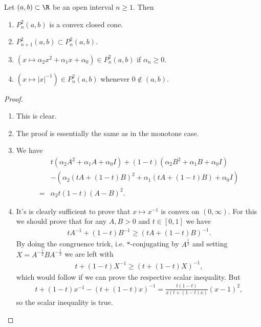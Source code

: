 \begin{prop}
	Let $(a, b) \subset \R$ be an open interval $n \geq 1$. Then
	\begin{enumerate}
		\item $P_{n}^{2}(a, b)$ is a convex closed cone.
		\item $P_{n + 1}^{2}(a, b) \subset P_{n}^{2}(a, b)$.
		\item $\left(x \mapsto \alpha_{2} x^{2} + \alpha_{1} x + \alpha_{0}\right) \in P^{2}_{n}(a, b)$ if $\alpha_{n} \geq 0$.
		\item $\left(x \mapsto |x|^{-1}\right) \in P^{2}_{n}(a, b)$ whenever $0 \notin (a, b)$.
	\end{enumerate}
\end{prop}
\begin{proof}
	\begin{enumerate}
		\item This is clear.
		\item The proof is essentially the same as in the monotone case.
		\item We have
		\begin{align*}
			& t (\alpha_{2} A^2 + \alpha_{1} A + \alpha_{0} I) + (1 - t) (\alpha_{2} B^2 + \alpha_{1} B + \alpha_{0} I) \\
			&- (\alpha_{2} (t A + (1 - t) B)^2 + \alpha_{1} (t A + (1 - t) B) + \alpha_{0} I) \\
			=& \alpha_{2} t (1 - t) (A - B)^{2}.
		\end{align*}
		\item It's is clearly sufficient to prove that $x \mapsto x^{-1}$ is convex on $(0, \infty)$. For this we should prove that for any $A, B > 0$ and $t \in [0, 1]$ we have
		\begin{align*}
			t A^{-1} + (1 - t) B^{-1} \geq (t A + (1 - t) B)^{-1}.
		\end{align*}
		By doing the congruence trick, i.e. $*$-conjugating by $A^{\frac{1}{2}}$ and setting $X = A^{-\frac{1}{2}} B A^{-\frac{1}{2}}$ we are left with
		\begin{align*}
			t + (1 - t) X^{-1} \geq (t + (1 - t) X)^{-1},
		\end{align*}
		which would follow if we can prove the respective scalar inequality. But
		\begin{align*}
			t + (1 - t) x^{-1} - (t + (1 - t) x)^{-1} = \frac{t (1 - t)}{x (t + (1 - t) x)} (x - 1)^{2},
		\end{align*}
		so the scalar inequality is true.
	\end{enumerate}
\end{proof}

